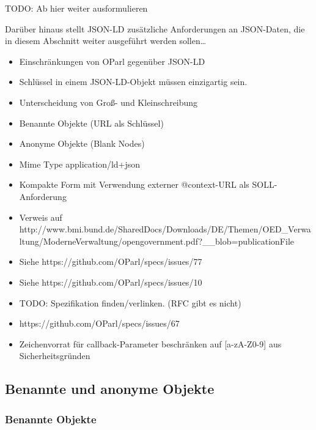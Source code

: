 \documentclass[,a4paper]{article}
\begin{document}
TODO: Ab hier weiter ausformulieren

Darüber hinaus stellt JSON-LD zusätzliche Anforderungen an JSON-Daten,
die in diesem Abschnitt weiter ausgeführt werden sollen\ldots{}

\begin{itemize}
\item
  Einschränkungen von OParl gegenüber JSON-LD
\item
  Schlüssel in einem JSON-LD-Objekt müssen einzigartig sein.
\item
  Unterscheidung von Groß- und Kleinschreibung
\item
  Benannte Objekte (URL als Schlüssel)
\item
  Anonyme Objekte (Blank Nodes)
\item
  Mime Type application/ld+json
\item
  Kompakte Form mit Verwendung externer @context-URL als
  SOLL-Anforderung
\item
  Verweis auf
  http://www.bmi.bund.de/SharedDocs/Downloads/DE/Themen/OED\_Verwaltung/ModerneVerwaltung/opengovernment.pdf?\_\_blob=publicationFile
\item
  Siehe https://github.com/OParl/specs/issues/77
\item
  Siehe https://github.com/OParl/specs/issues/10
\end{itemize}


\begin{itemize}
\item
  TODO: Spezifikation finden/verlinken. (RFC gibt es nicht)
\item
  https://github.com/OParl/specs/issues/67
\item
  Zeichenvorrat für callback-Parameter beschränken auf {[}a-zA-Z0-9{]}
  aus Sicherheitsgründen
\end{itemize}

\subsection{Benannte und anonyme Objekte}

\subsubsection{Benannte Objekte}
\end{document}
